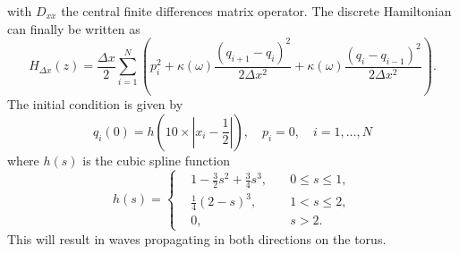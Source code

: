 with $D_{xx}$ the central finite differences matrix operator. The discrete Hamiltonian can finally be written as
\begin{equation} \label{eq:NuRe:7}
	H_{\Delta x}(z) = \frac{\Delta x}2 \sum_{i=1}^{N} \left( p_i^2 + \kappa(\omega) \frac{(q_{i+1} - q_i)^2}{2\Delta x ^ 2} + \kappa(\omega) \frac{(q_{i} - q_{i-1})^2}{2\Delta x ^ 2} \right).
\end{equation}
The initial condition is given by
\begin{equation} \label{eq:NuRe:8}
	q_i(0) = h( 10\times|x_i - \frac{1}{2}| ), \quad p_i = 0, \quad i=1,\dots,N
\end{equation}
where $h(s)$ is the cubic spline function
\begin{equation} \label{eq:NuRe:9}
h(s) = 
\left\{
\begin{aligned}
& 1 - \frac{3}{2}s^2 + \frac{3}{4}s^3, \quad & 0\leq s \leq 1, \\
& \frac{1}{4}(2-s)^3, & 1< s \leq 2, \\
& 0, & s > 2.
\end{aligned}
\right.
\end{equation}
This will result in waves propagating in both directions on the torus.


